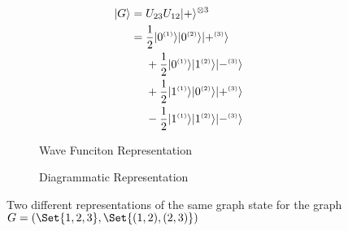 \begin{figure}[tb]
  \centering
  \begin{subfigure}[b]{0.4\linewidth}
    \begin{align*}
      \lvert G\rangle 
        &= U_{23}U_{12}\lvert+\rangle^{\otimes 3} \\
        & =\begin{aligned}[t]
          &\frac{1}{2} \lvert0^{\scriptscriptstyle(1)}\rangle \lvert0^{\scriptscriptstyle(2)}\rangle \lvert+^{\scriptscriptstyle(3)}\rangle \\
          &+ \frac{1}{2} \lvert0^{\scriptscriptstyle(1)}\rangle \lvert1^{\scriptscriptstyle(2)}\rangle \lvert-^{\scriptscriptstyle(3)}\rangle \\
          &+ \frac{1}{2} \lvert1^{\scriptscriptstyle(1)}\rangle \lvert0^{\scriptscriptstyle(2)}\rangle \lvert+^{\scriptscriptstyle(3)}\rangle\\
          &- \frac{1}{2} \lvert1^{\scriptscriptstyle(1)}\rangle \lvert1^{\scriptscriptstyle(2)}\rangle \lvert-^{\scriptscriptstyle(3)}\rangle
        \end{aligned}
    \end{align*}
    \caption{Wave Funciton Representation\label{fig:graph_state:wfn}}
  \end{subfigure}
  \hspace{5pt}
  \begin{subfigure}[b]{0.4\linewidth}
    \centering
    
    \caption{Diagrammatic Representation}
  \end{subfigure}
  \caption{Two different representations of the same graph state for the graph \(G=\p{\Set{1,2,3},\Set{(1,2),(2,3)}}\) \label{fig:graph_state}}
\end{figure}

